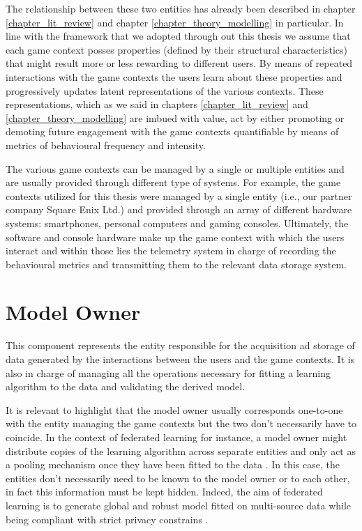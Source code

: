 The relationship between these two entities has already been described in chapter \ref{chapter_lit_review} and chapter \ref{chapter_theory_modelling} in particular. In line with the framework that we adopted through out this thesis we assume that each game context posses properties (defined by their structural characteristics) that might result more or less rewarding to different users. By means of repeated interactions with the game contexts the users learn about these properties and progressively updates latent representations of the various contexts. These representations, which as we said in chapters \ref{chapter_lit_review} and \ref{chapter_theory_modelling} are imbued with value, act by either promoting or demoting future engagement with the game contexts quantifiable by means of metrics of behavioural frequency and intensity.

The various game contexts can be managed by a single or multiple entities and are usually provided through different type of systems. For example, the game contexts utilized for this thesis were managed by a single entity (i.e., our partner company Square Enix Ltd.) and provided through an array of different hardware systems: smartphones, personal computers and gaming consoles. Ultimately, the software and console hardware make up the game context with which the users interact and within those lies the telemetry system in charge of recording the behavioural metrics and transmitting them to the relevant data storage system.

\section{Model Owner}
\label{model_owner}
This component represents the entity responsible for the acquisition ad storage of data generated by the interactions between the users and the game contexts. It is also in charge of managing all the operations necessary for fitting a learning algorithm to the data and validating the derived model. 

It is relevant to highlight that the model owner usually corresponds one-to-one with the entity managing the game contexts but the two don't necessarily  have to coincide. In the context of federated learning  \cite{yang2019federated} for instance, a model owner might distribute copies of the learning algorithm across separate entities and only act as a pooling mechanism  once they have been fitted to the data \cite{kairouz2021advances}. In this case, the entities don't necessarily need to be known to the model owner or to each other, in fact this information must be kept hidden. Indeed, the aim of federated learning is to generate global and robust model fitted on multi-source data while being compliant with strict privacy constrains \cite{yang2019federated, kairouz2021advances}. 

